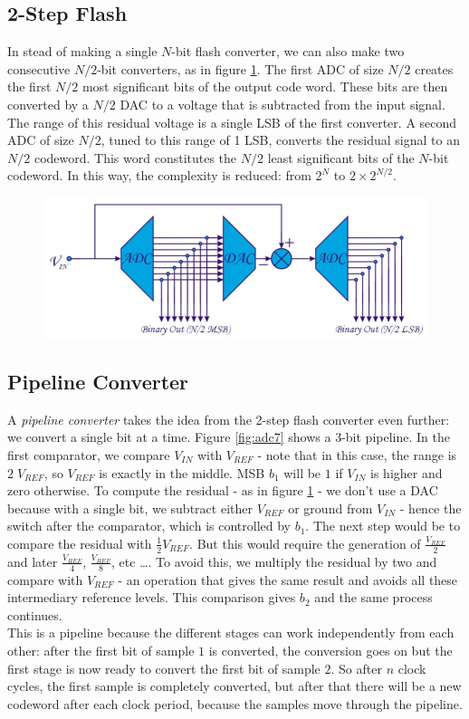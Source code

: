\subsection{2-Step Flash}
In stead of making a single $N$-bit flash converter, we can also make two consecutive $N/2$-bit converters, as in figure \ref{fig:adc6}. The first ADC of size $N/2$ creates the first $N/2$ most significant bits of the output code word. These bits are then converted by a $N/2$ DAC to a voltage that is subtracted from the input signal. The range of this residual voltage is a single LSB of the first converter. A second ADC of size $N/2$, tuned to this range of 1 LSB, converts the residual signal to an $N/2$ codeword. This word constitutes the $N/2$ least significant bits of the $N$-bit codeword. In this way, the complexity is reduced: from $2^N$ to $2 \times 2^{N/2}$.
\begin{figure}[h!]
	\centering
	\includegraphics[width=14cm]{figures/ch18/adc6.jpg}
	\caption{}
	\label{fig:adc6}
\end{figure}

\subsection{Pipeline Converter}

A \emph{pipeline converter} takes the idea from the 2-step flash converter even further: we convert a single bit at a time. Figure \ref{fig:adc7} shows a $3$-bit pipeline. In the first comparator, we compare $V_{IN}$ with $V_{REF}$ - note that in this case, the range is $2\;V_{REF}$, so $V_{REF}$ is exactly in the middle. MSB $b_1$ will be $1$ if $V_{IN}$ is higher and zero otherwise. To compute the residual - as in figure \ref{fig:adc6} - we don't use a DAC because with a single bit, we subtract either $V_{REF}$ or ground from $V_{IN}$ - hence the switch after the comparator, which is controlled by $b_1$. The next step would be to compare the residual with $\frac{1}{2} V_{REF}$. But this would require the generation of $\frac{V_{REF}}{2}$ and later $\frac{V_{REF}}{4}$, $\frac{V_{REF}}{8}$, etc \ldots. To avoid this, we multiply the residual by two and compare with $V_{REF}$ - an operation that gives the same result and avoids all these intermediary reference levels. This comparison gives $b_2$ and the same process continues.\\
This is a pipeline because the different stages can work independently from each other: after the first bit of sample $1$ is converted, the conversion goes on but the first stage is now ready to convert the first bit of sample $2$. So after $n$ clock cycles, the first sample is completely converted, but after that there will be a new codeword after each clock period, because the samples move through the pipeline.

